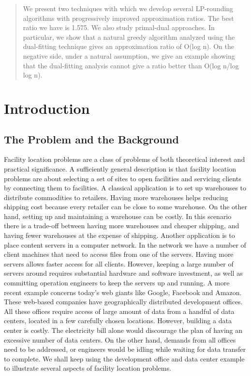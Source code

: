 \documentclass[oneside,final]{ucr}
\begin{document}
\begin{frontmatter}
\begin{abstract}
  We present two techniques with which we develop several
  LP-rounding algorithms with progressively improved
  approximation ratios. The best ratio we have is 1.575. We
  also study primal-dual approaches. In particular, we show
  that a natural greedy algorithm analyzed using the
  dual-fitting technique gives an approximation ratio of
  O(log n). On the negative side, under a natural
  assumption, we give an example showing that the
  dual-fitting analysis cannot give a ratio better than
  O(log n/log log n).
\end{abstract}

\tableofcontents
\listoffigures
\listoftables

\end{frontmatter}

\chapter{Introduction} \label{ch: intro}

\section{The Problem and the Background}
Facility location problems are a class of problems of both
theoretical interest and practical significance. A
sufficiently general description is that facility location
problems are about selecting a set of sites to open
facilities and servicing clients by connecting them to
facilities. A classical application is to set up warehouses
to distribute commodities to retailers.  Having more
warehouses helps reducing shipping cost because every
retailer can be close to some warehouse. On the other hand,
setting up and maintaining a warehouse can be costly. In
this scenario there is a trade-off between having more
warehouses and cheaper shipping, and having fewer warehouses
at the expense of shipping. Another application is to
place content servers in a computer network. In the network
we have a number of client machines that need to access
files from one of the servers. Having more servers allows
faster access for all clients. However, keeping a large
number of servers around requires substantial hardware and
software investment, as well as committing operation
engineers to keep the servers up and running. A more recent
example concerns today's web giants like Google, Facebook
and Amazon. These web-based companies have geographically
distributed development offices. All these offices require
access of large amount of data from a handful of data
centers, located in a few carefully chosen
locations. However, building a data center is costly. The
electricity bill alone would discourage the plan of having
an excessive number of data centers. On the other hand,
demands from all offices need to be addressed, or engineers
would be idling while waiting for data transfer to
complete. We shall keep using the development office and
data center example to illustrate several aspects of
facility location problems.
\end{document}
